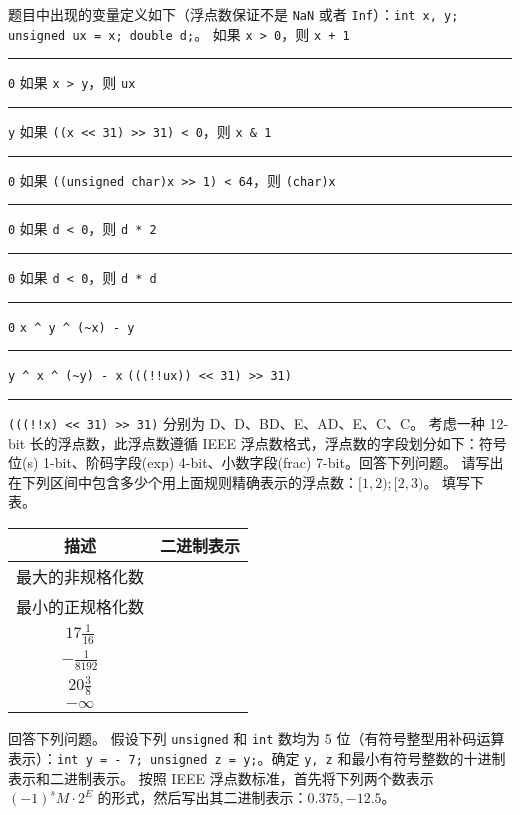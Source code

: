 \begin{problems}
        题目中出现的变量定义如下（浮点数保证不是 \texttt{NaN} 或者 \texttt{Inf}）：\texttt{int x, y; unsigned ux = x; double d;}。
        \qn 如果 \texttt{x > 0}，则 \texttt{x + 1} \rule{2.5cm}{0.25mm} \texttt{0}
        \qn 如果 \texttt{x > y}，则 \texttt{ux} \rule{2.5cm}{0.25mm} \texttt{y}
        \qn 如果 \verb|((x << 31) >> 31) < 0|，则 \verb|x & 1| \rule{2.5cm}{0.25mm} \texttt{0}
        \qn 如果 \verb|((unsigned char)x >> 1) < 64|，则 \texttt{(char)x} \rule{2.5cm}{0.25mm} \texttt{0}
        \qn 如果 \texttt{d < 0}，则 \texttt{d * 2} \rule{2.5cm}{0.25mm} \texttt{0}
        \qn 如果 \texttt{d < 0}，则 \texttt{d * d} \rule{2.5cm}{0.25mm} \texttt{0}
        \qn \verb|x ^ y ^ (~x) - y| \rule{2.5cm}{0.25mm} \verb|y ^ x ^ (~y) - x|
        \qn \verb|(((!!ux)) << 31) >> 31)| \rule{2.5cm}{0.25mm} \verb|(((!!x) << 31) >> 31)|
        \sol 分别为 D、D、BD、E、AD、E、C、C。
         考虑一种 12-bit 长的浮点数，此浮点数遵循 IEEE 浮点数格式，浮点数的字段划分如下：符号位(s) 1-bit、阶码字段(exp) 4-bit、小数字段(frac) 7-bit。回答下列问题。
            \qn 请写出在下列区间中包含多少个用上面规则精确表示的浮点数：$[1, 2); [2, 3)$。
            \qn 填写下表。
            \begin{table}[H]
                \centering
                \begin{tabular}{|c|c|}
                    \hline
                    描述 & 二进制表示 \\ \hline
                    最大的非规格化数 & {\qquad \qquad \qquad \qquad} \\ \hline
                    最小的正规格化数 & {\qquad \qquad \qquad \qquad} \\ \hline
                    $17 \frac{1}{16}$ & {\qquad \qquad \qquad \qquad} \\ \hline
                    $-\frac{1}{8192}$ & {\qquad \qquad \qquad \qquad} \\ \hline
                    $20 \frac{3}{8}$ & {\qquad \qquad \qquad \qquad} \\ \hline
                    $-\infty$ & {\qquad \qquad \qquad \qquad} \\ \hline
                \end{tabular}
            \end{table}
         回答下列问题。
            \qn 假设下列 \texttt{unsigned} 和 \texttt{int} 数均为 5 位（有符号整型用补码运算表示）：\texttt{int y = - 7; unsigned z = y;}。确定 \texttt{y, z} 和最小有符号整数的十进制表示和二进制表示。
            \qn 按照 IEEE 浮点数标准，首先将下列两个数表示 $(-1)^sM \cdot 2^E$ 的形式，然后写出其二进制表示：$0.375, -12.5$。
    \end{problems}